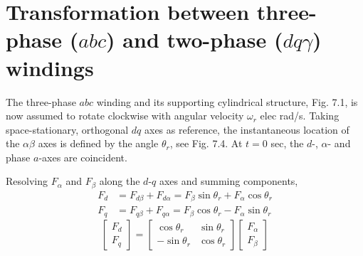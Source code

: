\documentclass[a4paper,numbers=noenddot,12pt]{scrbook}
\begin{document}
    \section{Transformation between three-phase ($abc$) and two-phase ($d q \gamma$) windings}

    The three-phase $abc$ winding and its supporting cylindrical structure, Fig. 7.1, is now assumed to rotate clockwise with angular velocity $\omega_r$ elec rad/s. Taking space-stationary, orthogonal $dq$ axes as reference, the instantaneous location of the $\alpha \beta$ axes is defined by the angle $\theta_r$, see Fig. 7.4. At $t = 0$ sec, the $d$-, $\alpha$- and phase $a$-axes are coincident.

    Resolving $F_{\alpha}$ and $F_{\beta}$ along the $d$-$q$ axes and summing components,
    \begin{equation}
        \begin{aligned}
            F_d & = F_{d \beta} + F_{d \alpha} = F_{\beta} \sin \theta_r + F_{\alpha} \cos \theta_r\\
            F_q & = F_{q \beta} + F_{q \alpha} = F_{\beta} \cos \theta_r - F_{\alpha} \sin \theta_r
        \end{aligned}
        \label{eq:Eq7.56}
    \end{equation}
    \begin{equation}
        \begin{bmatrix}
            F_d \\ F_q
        \end{bmatrix}
        =
        \begin{bmatrix}
            \cos \theta_r & \sin \theta_r \\
            -\sin \theta_r & \cos \theta_r
        \end{bmatrix}
        \begin{bmatrix}
            F_{\alpha} \\ F_{\beta}
        \end{bmatrix}
        \label{eq:Eq7.57}
    \end{equation}
\end{document}
